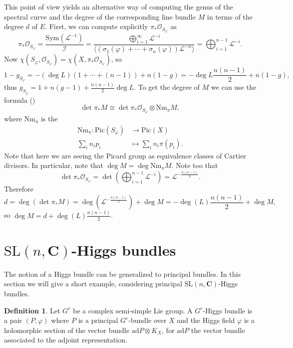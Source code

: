 \documentclass[12pt,a4paper]{book}
\theoremstyle{definition} \newtheorem{defn}[thm]{Definition}
\theoremstyle{definition} \newtheorem{ejemplo}[thm]{Example}
\theoremstyle{remark} \newtheorem{rem}[thm]{Remark}
\def\OO{\mathscr{O}}
\def\LL{\mathscr{L}}
\def\II{\mathscr{I}}
\def\CC{\mathbf{C}}
\def\ad{\mathrm{ad}}
\def\Nm{\mathrm{Nm}}
\def\SL{\mathrm{SL}}
\def\Sym{\mathrm{Sym}}
\def\Pic{\mathrm{Pic}}
\let\emph\relax
\begin{document}
  This point of view yields an alternative way of computing the genus of the spectral curve and the degree of the corresponding line bundle $M$ in terms of the degree $d$ of $E$. First, we can compute explicitly $\pi_*\OO_{S_\varphi}$ as
  \begin{equation*}
    \pi_*\OO_{S_\varphi}=\frac{\Sym(\LL^{-1})}{\II}=\frac{\bigoplus_{i=1}^\infty \LL^{-i}}{\langle(\sigma_1(\varphi)+\cdots+\sigma_n(\varphi))\LL^{-n}\rangle}=\bigoplus_{i=1}^{n-1} \LL^{-i}.
  \end{equation*}
  Now $\chi(S_\varphi,\OO_{S_\varphi})=\chi(X,\pi_*\OO_{S_\varphi})$, so 
  \begin{equation*}
    1-g_{S_{\varphi}}=-(\deg L)(1+\cdots+(n-1))+n(1-g)=-\deg L\frac{n(n-1)}{2}+n(1-g),
  \end{equation*}
  thus $g_{S_{\varphi}}=1+n(g-1)+\frac{n(n-1)}{2}\deg L$. To get the degree of $M$ we can use the formula (\cite[Ex. IV.2.6(a)]{hartshorne})
  \begin{equation*}
    \det \pi_*M \cong \det \pi_*\OO_{S_\varphi} \otimes \Nm_\pi M,
  \end{equation*}
  where $\Nm_\pi$ is the \emph{norm map}
  \begin{align*}
    \Nm_\pi :\Pic(S_{\varphi})&\longrightarrow \Pic(X)\\ 
    \sum_{i} n_ip_i &\longmapsto \sum_i n_i \pi(p_i). 
    \end{align*}
    Note that here we are seeing the Picard group as equivalence classes of Cartier divisors. In particular, note that $\deg M = \deg \Nm_\pi M$. Note too that
    \begin{equation*}
      \det \pi_* \OO_{S_\varphi} = \det\left( \bigoplus_{i=1}^{n-1} \LL^{-i}\right) = \LL^{-\frac{n(n-1)}{2}}.
    \end{equation*}
    Therefore
    \begin{equation*}
      d=\deg(\det \pi_*M)=\deg\left( \LL^{-\frac{n(n-1)}{2}} \right)+ \deg M= -\deg(L)\frac{n(n-1)}{2} + \deg M ,
    \end{equation*}
    so $\deg M = d+\deg(L)\frac{n(n-1)}{2}$.
	  
\section{$\SL(n,\CC)$-Higgs bundles}
The notion of a Higgs bundle can be generalized to principal bundles. In this section we will give a short example, considering principal $\SL(n,\CC)$-Higgs bundles.

\begin{defn}
  Let $G^c$ be a complex semi-simple Lie group. A $G^c$-Higgs bundle is a pair $(P,\varphi)$ where $P$ is a principal $G^c$-bundle over $X$ and the Higgs field $\varphi$ is a holomorphic section of the vector bundle $\ad P \otimes K_X$, for $\ad P$ the vector bundle associated to the adjoint representation.
\end{defn}
\end{document}
